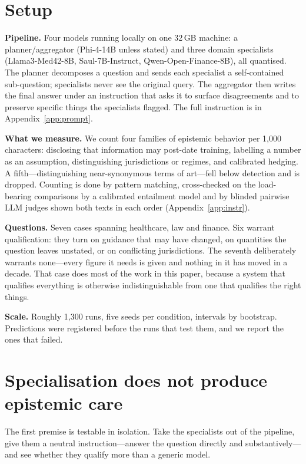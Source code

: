 \documentclass[11pt]{article}
\begin{document}
\section{Setup}
\textbf{Pipeline.} Four models running locally on one 32\,GB machine: a
planner/aggregator (Phi-4-14B unless stated) and three domain specialists
(Llama3-Med42-8B, Saul-7B-Instruct, Qwen-Open-Finance-8B), all quantised. The
planner decomposes a question and sends each specialist a self-contained
sub-question; specialists never see the original query. The aggregator then
writes the final answer under an instruction that asks it to surface
disagreements and to preserve specific things the specialists flagged. The
full instruction is in Appendix~\ref{app:prompt}.

\textbf{What we measure.} We count four families of epistemic behavior per
1{,}000 characters: disclosing that information may post-date training,
labelling a number as an assumption, distinguishing jurisdictions or regimes,
and calibrated hedging. A fifth---distinguishing near-synonymous terms of
art---fell below detection and is dropped. Counting is done by pattern
matching, cross-checked on the load-bearing comparisons by a calibrated
entailment model and by blinded pairwise LLM judges shown both texts in each
order (Appendix~\ref{app:instr}).

\textbf{Questions.} Seven cases spanning healthcare, law and finance. Six
warrant qualification: they turn on guidance that may have changed, on
quantities the question leaves unstated, or on conflicting jurisdictions. The
seventh deliberately warrants none---every figure it needs is given and
nothing in it has moved in a decade. That case does most of the work in this
paper, because a system that qualifies everything is otherwise
indistinguishable from one that qualifies the right things.

\textbf{Scale.} Roughly 1{,}300 runs, five seeds per condition, intervals by
bootstrap. Predictions were registered before the runs that test them, and
we report the ones that failed.

\section{Specialisation does not produce epistemic care}
The first premise is testable in isolation. Take the specialists out of the
pipeline, give them a neutral instruction---answer the question directly and
substantively---and see whether they qualify more than a generic model.
\end{document}
